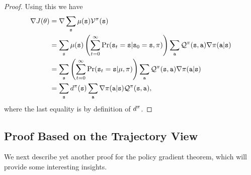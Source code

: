 \begin{proof}
Using this we have
\begin{align*}
\nabla J(\theta) &= \nabla \sum_{{\tt s}} \mu({\tt s}) \mathcal{V}^\pi ({\tt s})\\
&= \sum_{\tt s} \mu({\tt s}) \left(\sum_{t=0}^\infty \Pr({\tt s}_t = {\tt s} | {\tt s}_0 = {\tt s}, \pi) \right) \sum_{\tt a} \mathcal{Q}^\pi ({\tt s},{\tt a}) \nabla\pi({\tt a}|{\tt s}) \\
&= \sum_{\tt s} \left(\sum_{t=0}^\infty \Pr({\tt s}_t = {\tt s} | \mu, \pi) \right) \sum_{\tt a} \mathcal{Q}^\pi ({\tt s},{\tt a}) \nabla\pi({\tt a}|{\tt s}) \\
&= \sum_{\tt s} d^{\pi}({\tt s}) \sum_{\tt a} \nabla\pi({\tt a}|{\tt s}) \mathcal{Q}^\pi ({\tt s},{\tt a}) ,
\end{align*}
where the last equality is by definition of $d^{\pi}$.
\end{proof}


\subsection{Proof Based on the Trajectory View}

We next describe yet another proof for the policy gradient theorem, which will provide some interesting insights.

